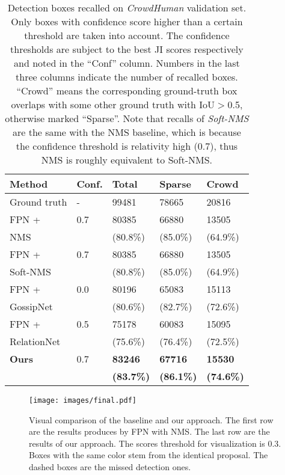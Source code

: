 \documentclass[10pt,twocolumn,letterpaper]{article}
\begin{document}
\begin{table}[ht]
   \centering
   \begin{tabular}{p{24mm}|p{7mm}<{\centering}|p{10mm}<{\centering}p{10mm}<{\centering}p{10mm}<{\centering}}
   \toprule
   Method & Conf. & Total & Sparse  & Crowd \\
   \hline
   Ground truth & - & 99481 & 78665 & 20816 \\
   \hline
   FPN + & 0.7 & 80385   & 66880 & 13505 \\
   NMS  	& & (80.8\%) & (85.0\%) & (64.9\%) \\
\hline
   FPN + & 0.7 & 80385   & 66880 & 13505 \\
   Soft-NMS \cite{softnms} & & (80.8\%) & (85.0\%) & (64.9\%) \\
   \hline
   FPN + & 0.0 & 80196 & 65083 & 15113 \\
   GossipNet \cite{learningnms} & & (80.6\%) & (82.7\%) & (72.6\%) \\
   \hline
   FPN + & 0.5 & 75178 & 60083 & 15095 \\
   RelationNet \cite{hu2017relation} & & (75.6\%) & (76.4\%) & (72.5\%) \\
   \hline
   \textbf{Ours}  & 0.7 &  \textbf{83246} & \textbf{67716} & \textbf{15530} \\
            & & \textbf{(83.7\%)} & \textbf{(86.1\%)} & \textbf{(74.6\%)} \\
   \bottomrule
   \end{tabular}
   \caption{Detection boxes recalled on \emph{CrowdHuman} validation set. 
   Only boxes with confidence score higher than a certain threshold are taken into account.
   The confidence thresholds are subject to the best JI scores respectively and noted in the ``Conf'' column.
   Numbers in the last three columns indicate the number of recalled boxes.
   ``Crowd'' means the corresponding ground-truth box overlaps with some other 
   ground truth with IoU$>$0.5, otherwise marked ``Sparse''. 
   Note that recalls of \emph{Soft-NMS} \cite{softnms} are the same with the 
   NMS baseline, which is because the confidence threshold is relativity high 
   (0.7), thus NMS is roughly equivalent to Soft-NMS.  }

   \label{tbl:crowdhuman_recall}
\end{table}


\begin{figure*}
	\begin{center}
		\texttt{[image: images/final.pdf]}
	\end{center}
	\caption{Visual comparison of the baseline and our approach. The first row are the results produces by FPN with NMS. The last row are the results of our approach. The scores threshold for visualization is 0.3. Boxes with the same color stem from the identical proposal. The dashed boxes are the missed detection ones.}
	\label{fig:presentation}
\end{figure*}
\end{document}
